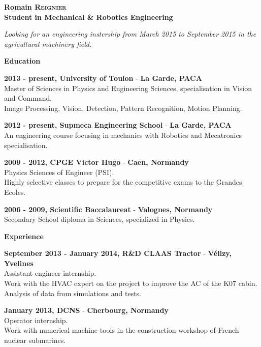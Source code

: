 \documentclass[a4paper,11pt,final]{memoir}
\newcommand{\Sep}{\vspace{1.5em}}
\newcommand{\SmallSep}{\vspace{0.5em}}
\newenvironment{AboutMe}
	{\ignorespaces%
}
	{\Sep\ignorespacesafterend}
\newcommand{\CVSection}[1]
	{\Large\textbf{#1}\par
	\SmallSep\normalsize\normalfont}
\newcommand{\CVItem}[1]
	{\textbf{\color{RoyalBlue} #1}\normalsize\normalfont}
\newcommand{\city}[1]
	{{\small\textbf{#1}}\normalsize\normalfont}
\begin{document}
\Huge\bfseries {\color{RoyalBlue} Romain \textsc{Reignier}} \\
\Large\bfseries  Student in Mechanical \& Robotics Engineering\\

\normalsize\normalfont

\begin{AboutMe}
\emph{Looking for an engineering instership from March 2015 to September 2015 in the agricultural machinery field.}
\end{AboutMe}

\CVSection{Education}

\CVItem{2013 - present, University of Toulon} - \city{La Garde, PACA}\\
Master of Sciences in Physics and Engineering Sciences, specialisation in Vision and Command.\\
Image Processing, Vision, Detection, Pattern Recognition, Motion Planning.
\SmallSep

\CVItem{2012 - present, Supmeca Engineering School} - \city{La Garde, PACA}\\
An engineering course focusing in mechanics with Robotics and Mecatronics specialisation.
\SmallSep

\CVItem{2009 - 2012, CPGE Victor Hugo} - \city{Caen, Normandy}\\
Physics Sciences of Engineer (PSI).\\
Highly selective classes to prepare for the competitive exams to the Grandes Ecoles.
\SmallSep

\CVItem{2006 - 2009, Scientific Baccalaureat} - \city{Valognes, Normandy}\\
Secondary School diploma in Sciences, specialized in Physics.
\Sep

\CVSection{Experience}
\CVItem{September 2013 - January 2014, R\&D CLAAS Tractor} - \city{Vélizy, Yvelines}\\
Assistant engineer internship.\\
Work with the HVAC expert on the project to improve the AC of the K07 cabin.
Analysis of data from simulations and tests.
\SmallSep

\CVItem{January 2013, DCNS} - \city{Cherbourg, Normandy}\\
Operator internship.\\
Work with numerical machine tools in the construction workshop of French nuclear
submarines.
\SmallSep
\end{document}

